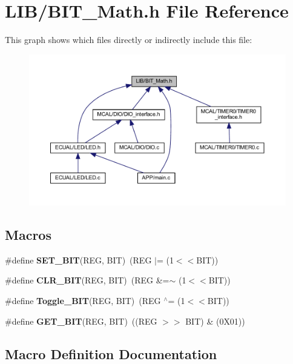 \section{L\+I\+B/\+B\+I\+T\+\_\+\+Math.h File Reference}
\label{_b_i_t___math_8h}
This graph shows which files directly or indirectly include this file\+:
\nopagebreak
\begin{figure}[H]
\begin{center}
\leavevmode
\includegraphics[width=350pt]{_b_i_t___math_8h__dep__incl}
\end{center}
\end{figure}
\subsection*{Macros}
\begin{DoxyCompactItemize}
\item 
\#define \textbf{ S\+E\+T\+\_\+\+B\+IT}(R\+EG,  B\+IT)~(R\+EG $\vert$= (1$<$$<$B\+IT))
\item 
\#define \textbf{ C\+L\+R\+\_\+\+B\+IT}(R\+EG,  B\+IT)~(R\+EG \&=$\sim$ (1$<$$<$B\+IT))
\item 
\#define \textbf{ Toggle\+\_\+\+B\+IT}(R\+EG,  B\+IT)~(R\+EG $^\wedge$= (1$<$$<$B\+IT))
\item 
\#define \textbf{ G\+E\+T\+\_\+\+B\+IT}(R\+EG,  B\+IT)~((R\+EG $>$$>$ B\+IT) \& (0\+X01))
\end{DoxyCompactItemize}


\subsection{Macro Definition Documentation}
\mbox{\label{_b_i_t___math_8h_a96fae2c0e48fd3f85b2438aa61ba4550}} 
